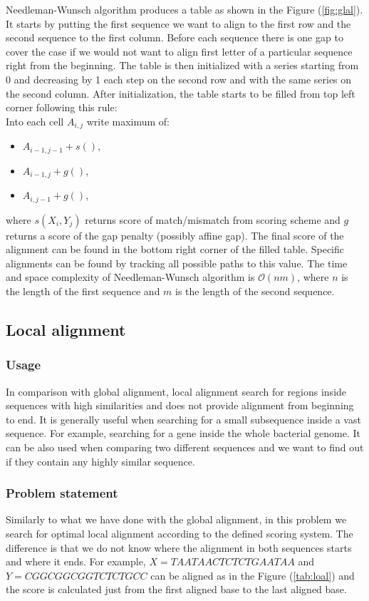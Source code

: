Needleman-Wunsch algorithm produces a table as shown in the Figure (\ref{fig:glal}).
It starts by putting the first sequence we want to align to the first row and the second sequence to the first column.
Before each sequence there is one gap to cover the case if we would not want to align first letter of a particular sequence right from the beginning.
The table is then initialized with a series starting from 0 and decreasing by 1 each step on the second row and with the same series on the second column.
After initialization, the table starts to be filled from top left corner following this rule:\\
Into each cell $A_{i,j}$ write maximum of:
\begin{itemize}
\item $A_{i-1, j-1} + s()$,
\item $A_{i-1, j} + g()$,
\item $A_{i, j-1} + g()$,
\end{itemize}
where $s(X_i, Y_j)$ returns score of match/mismatch from scoring scheme and $g$ returns a score of the gap penalty (possibly affine gap).
The final score of the alignment can be found in the bottom right corner of the filled table.
Specific alignments can be found by tracking all possible paths to this value.
The time and space complexity of Needleman-Wunsch algorithm is $\mathcal{O}(nm)$, where $n$ is the length of the first sequence and $m$ is the length of the second sequence.

\subsection{Local alignment}
\subsubsection{Usage}
In comparison with global alignment, local alignment search for regions inside sequences with high similarities and does not provide alignment from beginning to end.
It is generally useful when searching for a small subsequence inside a vast sequence.
For example, searching for a gene inside the whole bacterial genome.
It can be also used when comparing two different sequences and we want to find out if they contain any highly similar sequence.

\subsubsection{Problem statement}
Similarly to what we have done with the global alignment, in this problem we search for optimal local alignment according to the defined scoring system.
The difference is that we do not know where the alignment in both sequences starts and where it ends.
For example, $ X = TAATAACTCTCTGAATAA $ and $ Y = CGGCGGCGGTCTCTGCC $ can be aligned as in the Figure (\ref{tab:loal}) and the score is calculated just from the first aligned base to the last aligned base.

